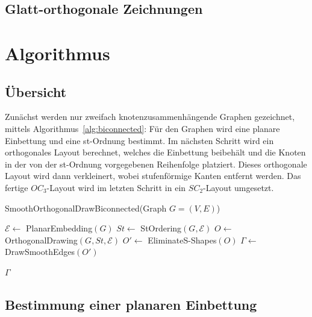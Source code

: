 \documentclass[a4paper]{scrreprt}
\theoremstyle{definition}
\newcommand{\Epsilon}{\mathcal{E}}
\begin{document}




\section{Glatt-orthogonale Zeichnungen}

\cite{bekos-13}


\chapter{Algorithmus}

\section{Übersicht}

Zunächst werden nur zweifach knotenzusammenhängende Graphen gezeichnet, mittels Algorithmus~\ref{alg:biconnected}: Für den Graphen wird eine planare Einbettung und eine st-Ordnung bestimmt. Im nächsten Schritt wird ein orthogonales Layout berechnet, welches die Einbettung beibehält und die Knoten in der von der st-Ordnung vorgegebenen Reihenfolge platziert. Dieses orthogonale Layout wird dann verkleinert, wobei stufenförmige Kanten entfernt werden. Das fertige $OC_3$-Layout wird im letzten Schritt in ein $SC_2$-Layout umgesetzt.

\begin{algorithm}[ht]
  \caption{SmoothOrthogonalDrawBiconnected(Graph $G = (V,E)$)}
  \label{alg:biconnected}
  
  $\Epsilon \leftarrow$ PlanarEmbedding$(G)$ \;
  $St \leftarrow$ StOrdering$(G, \Epsilon)$ \;
  $O \leftarrow$ OrthogonalDrawing$(G,St,\Epsilon)$ \;
  $O' \leftarrow$ EliminateS-Shapes$(O)$ \;
  $\Gamma \leftarrow$ DrawSmoothEdges$(O')$ \;
  
  \Return $\Gamma$
\end{algorithm}


\section{Bestimmung einer planaren Einbettung}


\cite{hopcroft+tarjan-74} \cite{patrignani-07} \cite{brandes-09}
\end{document}
